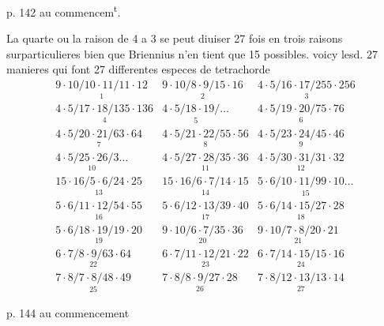 \documentclass[11pt,a4paper]{article}
\begin{document}

p. 142 au commencem\textsuperscript{t}.

La quarte ou la raison de 4 a 3 se peut diuiser 27 fois en trois raisons surparticulieres bien que Briennius n'en tient que 15 possibles. voicy lesd. 27 manieres qui font 27 differentes especes de tetrachorde
\[
\begin{array}{ccc}
\underset{1}{9\cdot 10/10\cdot 11/11\cdot 12} & \underset{2}{9\cdot 10/8\cdot 9/15\cdot 16} & \underset{3}{4\cdot 5/16\cdot 17/255\cdot 256} \\[4pt]
\underset{4}{4\cdot 5/17\cdot 18/135\cdot 136} & \underset{5}{4\cdot 5/18\cdot 19/\ldots} & \underset{6}{4\cdot 5/19\cdot 20/75\cdot 76} \\[4pt]
\underset{7}{4\cdot 5/20\cdot 21/63\cdot 64} & \underset{8}{4\cdot 5/21\cdot 22/55\cdot 56} & \underset{9}{4\cdot 5/23\cdot 24/45\cdot 46} \\[4pt]
\underset{10}{4\cdot 5/25\cdot 26/3\ldots} & \underset{11}{4\cdot 5/27\cdot 28/35\cdot 36} & \underset{12}{4\cdot 5/30\cdot 31/31\cdot 32} \\[4pt]
\underset{13}{15\cdot 16/5\cdot 6/24\cdot 25} & \underset{14}{15\cdot 16/6\cdot 7/14\cdot 15} & \underset{15}{5\cdot 6/10\cdot 11/99\cdot 10\ldots} \\[4pt]
\underset{16}{5\cdot 6/11\cdot 12/54\cdot 55} & \underset{17}{5\cdot 6/12\cdot 13/39\cdot 40} & \underset{18}{5\cdot 6/14\cdot 15/27\cdot 28} \\[4pt]
\underset{19}{5\cdot 6/18\cdot 19/19\cdot 20} & \underset{20}{9\cdot 10/6\cdot 7/35\cdot 36} & \underset{21}{9\cdot 10/7\cdot 8/20\cdot 21} \\[4pt]
\underset{22}{6\cdot 7/8\cdot 9/63\cdot 64} & \underset{23}{6\cdot 7/11\cdot 12/21\cdot 22} & \underset{24}{6\cdot 7/14\cdot 15/15\cdot 16} \\[4pt]
\underset{25}{7\cdot 8/7\cdot 8/48\cdot 49} & \underset{26}{7\cdot 8/8\cdot 9/27\cdot 28} & \underset{27}{7\cdot 8/12\cdot 13/13\cdot 14}
\end{array}
\]

p. 144 au commencement
\end{document}
